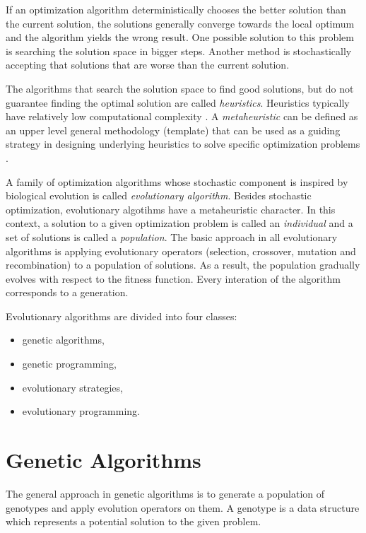 If an optimization algorithm deterministically chooses the better solution than the current solution, the solutions generally converge towards the local optimum and the algorithm yields the wrong result.
One possible solution to this problem is searching the solution space in bigger steps.
Another method is stochastically accepting that solutions that are worse than the current solution.

The algorithms that search the solution space to find good solutions, but do not guarantee finding the optimal solution are called \textit{heuristics}. 
Heuristics typically have relatively low computational complexity \cite{cupic2013prirodom}.
A \textit{metaheuristic} can be defined as an upper level general methodology (template) that can be used as a guiding strategy in designing underlying heuristics to solve specific optimization problems \cite{talbi2009metaheuristics}.

A family of optimization algorithms whose stochastic component is inspired by biological evolution is called \textit{evolutionary algorithm}.
Besides stochastic optimization, evolutionary algotihms have a metaheuristic character.
In this context, a solution to a given optimization problem is called an \textit{individual} and a set of solutions is called a \textit{population}.
The basic approach in all evolutionary algorithms is applying evolutionary operators (selection, crossover, mutation and recombination) to a population of solutions.
As a result, the population gradually evolves with respect to the fitness function.
Every interation of the algorithm corresponds to a generation.

Evolutionary algorithms are divided into four classes: 
\begin{itemize}
	\item genetic algorithms,
	\item genetic programming,
	\item evolutionary strategies,
	\item evolutionary programming.
\end{itemize}

\section{Genetic Algorithms}
The general approach in genetic algorithms is to generate a population of genotypes and apply evolution operators on them.
A genotype is a data structure which represents a potential solution to the given problem.

